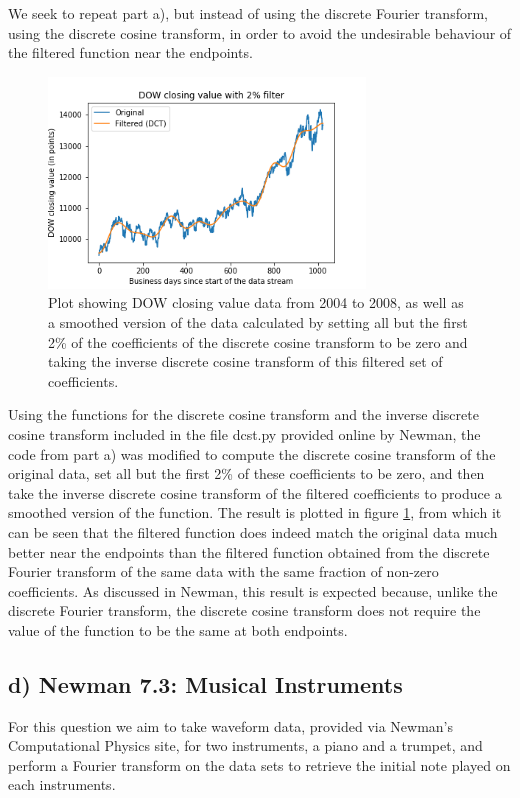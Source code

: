 \documentclass{article}
\begin{document}
We seek to repeat part a), but instead of using the discrete Fourier transform, using the discrete cosine transform, in order to avoid the undesirable behaviour of the filtered function near the endpoints.

\begin{figure}[H]
	\centering
	\includegraphics[width=0.75\textwidth]{../images/1c_dct.png}
	\caption{Plot showing DOW closing value data from 2004 to 2008, as well as a smoothed version of the data calculated by setting all but the first 2\% of the coefficients of the discrete cosine transform to be zero and taking the inverse discrete cosine transform of this filtered set of coefficients.}
	\label{fig:1c_dct}
\end{figure}

Using the functions for the discrete cosine transform and the inverse discrete cosine transform included in the file dcst.py provided online by Newman, the code from part a) was modified to compute the discrete cosine transform of the original data, set all but the first 2\% of these coefficients to be zero, and then take the inverse discrete cosine transform of the filtered coefficients to produce a smoothed version of the function. The result is plotted in figure \ref{fig:1c_dct}, from which it can be seen that the filtered function does indeed match the original data much better near the endpoints than the filtered function obtained from the discrete Fourier transform of the same data with the same fraction of non-zero coefficients. As discussed in Newman, this result is expected because, unlike the discrete Fourier transform, the discrete cosine transform does not require the value of the function to be the same at both endpoints.

\subsection{d) Newman 7.3: Musical Instruments}
For this question we aim to take waveform data, provided via Newman's Computational Physics site, for two instruments, a piano and a trumpet, and perform a Fourier transform on the data sets to retrieve the initial note played on each instruments. 
\end{document}
